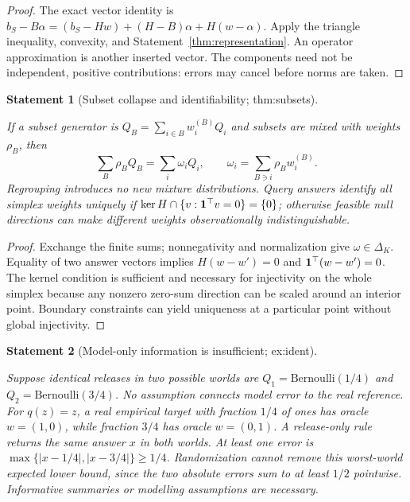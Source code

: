 \documentclass[11pt]{article}
\newtheorem{statement}{Statement}
\begin{document}
\begin{proof}
The exact vector identity is
$b_S-B\alpha=(b_S-Hw)+(H-B)\alpha+H(w-\alpha)$.
Apply the triangle inequality, convexity, and Statement~\ref{thm:representation}. An operator approximation is another inserted vector. The components need not be independent, positive contributions: errors may cancel before norms are taken.
\end{proof}

\begin{statement}[Subset collapse and identifiability; thm:subsets]\label{thm:subsets}

If a subset generator is $Q_B=\sum_{i\in B}w_i^{(B)}Q_i$ and subsets are mixed with weights $\rho_B$, then
\begin{equation}
\sum_B\rho_B Q_B=\sum_i\omega_iQ_i,\qquad
\omega_i=\sum_{B\ni i}\rho_Bw_i^{(B)}.
\end{equation}
Regrouping introduces no new mixture distributions. Query answers identify all simplex weights uniquely if $\ker H\cap\{v:\mathbf 1^\top v=0\}=\{0\}$; otherwise feasible null directions can make different weights observationally indistinguishable.

\end{statement}

\begin{proof}
Exchange the finite sums; nonnegativity and normalization give $\omega\in\Delta_K$. Equality of two answer vectors implies $H(w-w')=0$ and $\mathbf 1^\top(w-w')=0$. The kernel condition is sufficient and necessary for injectivity on the whole simplex because any nonzero zero-sum direction can be scaled around an interior point. Boundary constraints can yield uniqueness at a particular point without global injectivity.
\end{proof}

\begin{statement}[Model-only information is insufficient; ex:ident]\label{ex:ident}

Suppose identical releases in two possible worlds are $Q_1=\mathrm{Bernoulli}(1/4)$ and $Q_2=\mathrm{Bernoulli}(3/4)$. No assumption connects model error to the real reference. For $q(z)=z$, a real empirical target with fraction $1/4$ of ones has oracle $w=(1,0)$, while fraction $3/4$ has oracle $w=(0,1)$. A release-only rule returns the same answer $x$ in both worlds. At least one error is $\max\{|x-1/4|,|x-3/4|\}\ge1/4$. Randomization cannot remove this worst-world expected lower bound, since the two absolute errors sum to at least $1/2$ pointwise. Informative summaries or modelling assumptions are necessary.

\end{statement}
\end{document}

